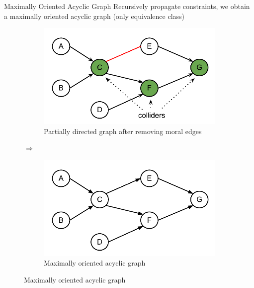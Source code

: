 \begin{frame}{Maximally Oriented Acyclic Graph}
Recursively propagate constraints, we obtain a maximally oriented acyclic graph (\alert{only equivalence class})
\begin{figure}
\setcounter{subfigure}{0}
\begin{subfigure}[H]{0.4\textwidth}
\includegraphics[scale=0.4]{imgs/BNs7nDet}
\caption{Partially directed graph after removing moral edges}
\end{subfigure}\hfill $\Rightarrow$ \hfill
\begin{subfigure}[H]{0.4\textwidth}
\includegraphics[scale=0.4]{imgs/BNs7n}
\caption{Maximally oriented acyclic graph}
\end{subfigure}
\end{figure}
\end{frame}